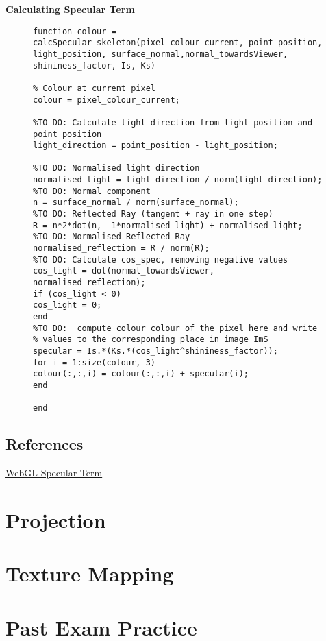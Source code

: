 \textbf{Calculating Specular Term}
\begin{figure}[!hbt]
	\begin{lstlisting}
function colour = calcSpecular_skeleton(pixel_colour_current, point_position, light_position, surface_normal,normal_towardsViewer, shininess_factor, Is, Ks)

% Colour at current pixel
colour = pixel_colour_current;

%TO DO: Calculate light direction from light position and point position
light_direction = point_position - light_position;

%TO DO: Normalised light direction
normalised_light = light_direction / norm(light_direction);
%TO DO: Normal component
n = surface_normal / norm(surface_normal);
%TO DO: Reflected Ray (tangent + ray in one step) 
R = n*2*dot(n, -1*normalised_light) + normalised_light;
%TO DO: Normalised Reflected Ray
normalised_reflection = R / norm(R);
%TO DO: Calculate cos_spec, removing negative values
cos_light = dot(normal_towardsViewer, normalised_reflection);
if (cos_light < 0)
cos_light = 0;
end
%TO DO:  compute colour colour of the pixel here and write
% values to the corresponding place in image ImS
specular = Is.*(Ks.*(cos_light^shininess_factor));
for i = 1:size(colour, 3)
colour(:,:,i) = colour(:,:,i) + specular(i);
end

end
	\end{lstlisting}	
\end{figure}

\subsection{References}
\href{http://learnwebgl.brown37.net/09_lights/lights_specular.html}{WebGL Specular Term}

\newpage
\section{Projection}
\newpage
\section{Texture Mapping}
\newpage
\section{Past Exam Practice}